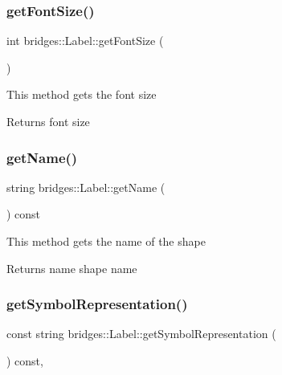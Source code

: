 \subsubsection{\texorpdfstring{getFontSize()}{getFontSize()}}
{\footnotesize\ttfamily int bridges\+::\+Label\+::get\+Font\+Size (\begin{DoxyParamCaption}{ }\end{DoxyParamCaption})\hspace{0.3cm}{\ttfamily [inline]}}

This method gets the font size

\begin{DoxyReturn}{Returns}
font size 
\end{DoxyReturn}
\mbox{\label{classbridges_1_1_label_a3a55f3d7e0794401bfb1c43ea85e7c86}} 
\subsubsection{\texorpdfstring{getName()}{getName()}}
{\footnotesize\ttfamily string bridges\+::\+Label\+::get\+Name (\begin{DoxyParamCaption}{ }\end{DoxyParamCaption}) const\hspace{0.3cm}{\ttfamily [inline]}}

This method gets the name of the shape

\begin{DoxyReturn}{Returns}
name shape name 
\end{DoxyReturn}
\mbox{\label{classbridges_1_1_label_af4bdf9e492cf2a2bf3a8be42bd282b44}} 
\subsubsection{\texorpdfstring{getSymbolRepresentation()}{getSymbolRepresentation()}}
{\footnotesize\ttfamily const string bridges\+::\+Label\+::get\+Symbol\+Representation (\begin{DoxyParamCaption}{ }\end{DoxyParamCaption}) const\hspace{0.3cm}{\ttfamily [inline]}, {\ttfamily [virtual]}}

